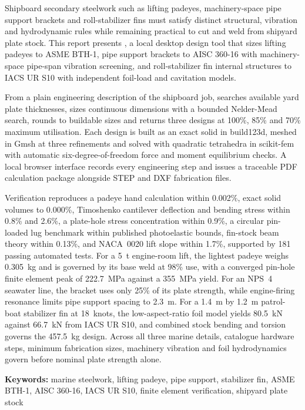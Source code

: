 Shipboard secondary steelwork such as lifting padeyes, machinery-space pipe
support brackets and roll-stabilizer fins must satisfy distinct structural,
vibration and hydrodynamic rules while remaining practical to cut and weld
from shipyard plate stock. This report presents \NEMO{}, a local desktop
design tool that sizes lifting padeyes to ASME BTH-1, pipe support brackets to
AISC 360-16 with machinery-space pipe-span vibration screening, and
roll-stabilizer fin internal structures to IACS UR S10 with independent
foil-load and cavitation models.

From a plain engineering description of the shipboard job, \NEMO{} searches
available yard plate thicknesses, sizes continuous dimensions with a bounded
Nelder-Mead search, rounds to buildable sizes and returns three designs at
100\%, 85\% and 70\% maximum utilisation. Each design is built as an exact
solid in build123d, meshed in Gmsh at three refinements and solved with
quadratic tetrahedra in scikit-fem with automatic six-degree-of-freedom force
and moment equilibrium checks. A local browser interface records every
engineering step and issues a traceable PDF calculation package alongside STEP
and DXF fabrication files.

Verification reproduces a padeye hand calculation within 0.002\%, exact solid
volumes to 0.000\%, Timoshenko cantilever deflection and bending stress within
0.8\% and 2.6\%, a plate-hole stress concentration within 0.9\%, a circular
pin-loaded lug benchmark within published photoelastic bounds, fin-stock beam
theory within 0.13\%, and NACA~0020 lift slope within 1.7\%, supported by 181
passing automated tests. For a 5~t engine-room lift, the lightest padeye
weighs 0.305~kg and is governed by its base weld at 98\% use, with a converged
pin-hole finite element peak of 222.7~MPa against a 355~MPa yield. For an
NPS~4 seawater line, the bracket uses only 25\% of its plate strength, while
engine-firing resonance limits pipe support spacing to 2.3~m. For a 1.4~m by
1.2~m patrol-boat stabilizer fin at 18~knots, the low-aspect-ratio foil model
yields 80.5~kN against 66.7~kN from IACS UR S10, and combined stock bending
and torsion governs the 457.5~kg design. Across all three marine details,
catalogue hardware steps, minimum fabrication sizes, machinery vibration and
foil hydrodynamics govern before nominal plate strength alone.

\vspace{0.5cm}
\noindent\textbf{Keywords:} marine steelwork, lifting padeye, pipe support,
stabilizer fin, ASME BTH-1, AISC 360-16, IACS UR S10, finite element
verification, shipyard plate stock
